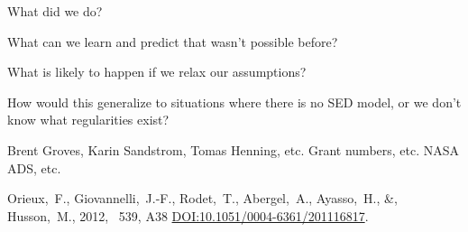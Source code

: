 \documentclass[12pt, preprint]{aastex}
\newcommand{\doi}[1]{{\footnotesize\href{http://doi.org/#1}{DOI:#1}}}
\newcommand{\acronym}[1]{{\small{#1}}}
\begin{document}
What did we do?

What can we learn and predict that wasn't possible before?

What is likely to happen if we relax our assumptions?

How would this generalize to situations where there is no SED model,
or we don't know what regularities exist?

\acknowledgements
Brent Groves, Karin Sandstrom, Tomas Henning, etc.
Grant numbers, etc.
\acronym{NASA ADS}, etc.

\begin{thebibliography}{dummy}
Orieux,~F., Giovannelli,~J.-F., Rodet,~T., Abergel,~A., Ayasso,~H., \&, Husson,~M.,
2012, \aap\ 539, A38 \doi{10.1051/0004-6361/201116817}.
\end{thebibliography}
\end{document}
